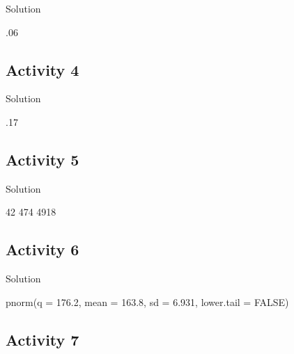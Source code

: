 \documentclass[
  oneside]{book}
\newenvironment{Shaded}{\begin{snugshade}}{\end{snugshade}}
\newcommand{\AttributeTok}[1]{\textcolor[rgb]{0.77,0.63,0.00}{#1}}
\newcommand{\ConstantTok}[1]{\textcolor[rgb]{0.00,0.00,0.00}{#1}}
\newcommand{\DecValTok}[1]{\textcolor[rgb]{0.00,0.00,0.81}{#1}}
\newcommand{\FloatTok}[1]{\textcolor[rgb]{0.00,0.00,0.81}{#1}}
\newcommand{\FunctionTok}[1]{\textcolor[rgb]{0.00,0.00,0.00}{#1}}
\newcommand{\NormalTok}[1]{#1}
\begin{document}
Solution

\begin{Shaded}
\begin{Highlighting}[]
\NormalTok{.}\DecValTok{06}
\end{Highlighting}
\end{Shaded}

\hypertarget{activity-4-5}{%
\subsection{Activity 4}\label{activity-4-5}}

Solution

\begin{Shaded}
\begin{Highlighting}[]
\NormalTok{.}\DecValTok{17}
\end{Highlighting}
\end{Shaded}

\hypertarget{activity-5-3}{%
\subsection{Activity 5}\label{activity-5-3}}

Solution

\begin{Shaded}
\begin{Highlighting}[]
\DecValTok{42}
\DecValTok{474}
\DecValTok{4918}
\end{Highlighting}
\end{Shaded}

\hypertarget{activity-6-3}{%
\subsection{Activity 6}\label{activity-6-3}}

Solution

\begin{Shaded}
\begin{Highlighting}[]
\FunctionTok{pnorm}\NormalTok{(}\AttributeTok{q =} \FloatTok{176.2}\NormalTok{, }\AttributeTok{mean =} \FloatTok{163.8}\NormalTok{, }\AttributeTok{sd =} \FloatTok{6.931}\NormalTok{, }\AttributeTok{lower.tail =} \ConstantTok{FALSE}\NormalTok{)}
\end{Highlighting}
\end{Shaded}

\hypertarget{activity-7-1}{%
\subsection{Activity 7}\label{activity-7-1}}
\end{document}
